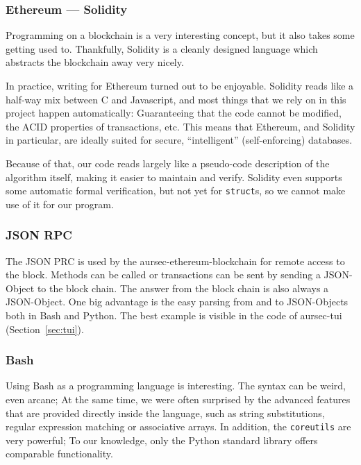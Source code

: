 
\subsubsection*{Ethereum --- Solidity}
Programming on a blockchain is a very interesting concept, but it also takes some getting used to. Thankfully, Solidity is a cleanly designed language which abstracts the blockchain away very nicely.

In practice, writing for Ethereum turned out to be enjoyable. Solidity reads like a half-way mix between C and Javascript, and most things that we rely on in this project happen automatically: Guaranteeing that the code cannot be modified, the ACID properties of transactions, etc.
This means that Ethereum, and Solidity in particular, are ideally suited for secure, \enquote{intelligent} (self-enforcing) databases.

Because of that, our code reads largely like a pseudo-code description of the algorithm itself, making it easier to maintain and verify.
Solidity even supports some automatic formal verification, but not yet for \texttt{struct}s, so we cannot make use of it for our program.

\subsubsection*{JSON RPC} %
The JSON PRC is used by the aursec-ethereum-blockchain for remote access to the block. Methods can be called or transactions can be sent by sending a JSON-Object to the block chain. The answer from the block chain is also always a JSON-Object. One big advantage is the easy parsing from and to JSON-Objects both in Bash and Python. The best example is visible in the code of aursec-tui (Section~\ref{sec:tui}).

\subsubsection*{Bash}
Using Bash as a programming language is interesting. The syntax can be weird, even arcane; At the same time, we were often surprised by the advanced features that are provided directly inside the language, such as string substitutions, regular expression matching or associative arrays.
In addition, the \texttt{coreutils} are very powerful; To our knowledge, only the Python standard library offers comparable functionality.

